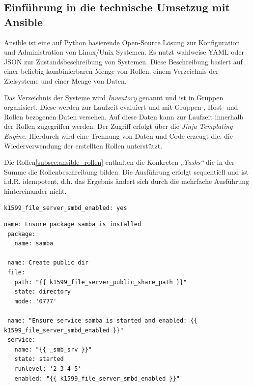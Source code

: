 \subsection{Einführung in die technische Umsetzug mit Ansible}
\label{subsec:ansiblecode}
Ansible ist eine auf Python basierende Open-Source Lösung zur Konfiguration und Administration von Linux/Unix Systemen. Es nutzt wahlweise YAML oder JSON zur Zustandsbeschreibung von Systemen. Diese Beschreibung basiert auf einer beliebig kombinierbaren Menge von Rollen, einem Verzeichnis der Zielsysteme und einer Menge von Daten.

Das Verzeichnis der Systeme wird \emph{Inventory} genannt und ist in Gruppen organisiert. Diese werden zur Laufzeit evaluiert und mit Gruppen-, Host- und Rollen bezogenen Daten versehen. Auf diese Daten kann zur Laufzeit innerhalb der Rollen zugegriffen werden. Der Zugriff erfolgt über die \textit{Jinja Templating Engine}. Hierdurch wird eine Trennung von Daten und Code erzeugt die, die Wiederverwendung der erstellten Rollen unterstützt.

Die Rollen\ref{subsec:ansible_rollen} enthalten die Konkreten \emph{„Tasks“} die in der Summe die Rollenbeschreibung bilden. Die Ausführung erfolgt sequentiell und ist i.d.R. idempotent, d.h. das Ergebnis ändert sich durch die mehrfache Ausführung hintereinander nicht.

\begin{lstlisting}[label=code:public,caption=Auszug aus ansible/group\_vars/file\_server/public]
k1599_file_server_smbd_enabled: yes
\end{lstlisting}

\begin{lstlisting}[label=code:public2,caption=Auszug aus ansible/roles/k1599\_file\_server/tasks/main.yml]
 name: Ensure package samba is installed
 package:
   name: samba

 name: Create public dir
 file:
   path: "{{ k1599_file_server_public_share_path }}"
   state: directory
   mode: '0777'

 name: "Ensure service samba is started and enabled: {{ k1599_file_server_smbd_enabled }}"
 service:
   name: "{{ _smb_srv }}"
   state: started
   runlevel: '2 3 4 5'
   enabled: "{{ k1599_file_server_smbd_enabled }}"
\end{lstlisting}
\bigskip

